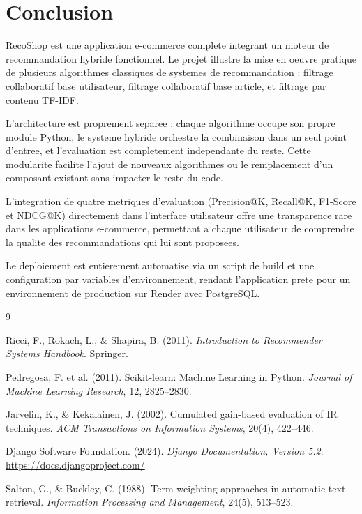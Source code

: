 \documentclass[12pt,a4paper]{report}
\begin{document}
\chapter{Conclusion}

RecoShop est une application e-commerce complete integrant un moteur de
recommandation hybride fonctionnel. Le projet illustre la mise en oeuvre
pratique de plusieurs algorithmes classiques de systemes de recommandation :
filtrage collaboratif base utilisateur, filtrage collaboratif base article, et
filtrage par contenu TF-IDF.

L'architecture est proprement separee : chaque algorithme occupe son propre
module Python, le systeme hybride orchestre la combinaison dans un seul point
d'entree, et l'evaluation est completement independante du reste. Cette
modularite facilite l'ajout de nouveaux algorithmes ou le remplacement d'un
composant existant sans impacter le reste du code.

L'integration de quatre metriques d'evaluation (Precision@K, Recall@K, F1-Score
et NDCG@K) directement dans l'interface utilisateur offre une transparence
rare dans les applications e-commerce, permettant a chaque utilisateur de
comprendre la qualite des recommandations qui lui sont proposees.

Le deploiement est entierement automatise via un script de build et une
configuration par variables d'environnement, rendant l'application prete
pour un environnement de production sur Render avec PostgreSQL.

\begin{thebibliography}{9}

Ricci, F., Rokach, L., \& Shapira, B. (2011).
\textit{Introduction to Recommender Systems Handbook}.
Springer.

Pedregosa, F. et al. (2011).
Scikit-learn: Machine Learning in Python.
\textit{Journal of Machine Learning Research}, 12, 2825--2830.

Jarvelin, K., \& Kekalainen, J. (2002).
Cumulated gain-based evaluation of IR techniques.
\textit{ACM Transactions on Information Systems}, 20(4), 422--446.

Django Software Foundation. (2024).
\textit{Django Documentation, Version 5.2}.
\url{https://docs.djangoproject.com/}

Salton, G., \& Buckley, C. (1988).
Term-weighting approaches in automatic text retrieval.
\textit{Information Processing and Management}, 24(5), 513--523.

\end{thebibliography}
\end{document}
